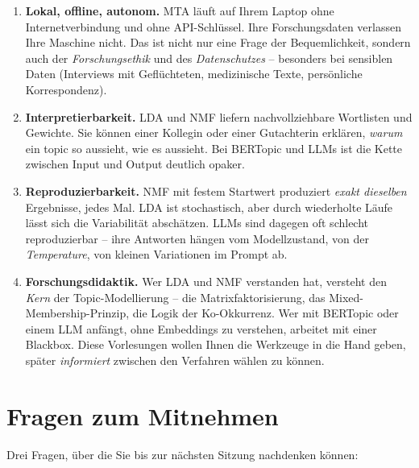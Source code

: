 \documentclass[a4paper,11pt]{article}
\begin{document}
\begin{enumerate}
\item \textbf{Lokal, offline, autonom.} MTA läuft auf Ihrem Laptop
ohne Internetverbindung und ohne API-Schlüssel. Ihre Forschungsdaten
verlassen Ihre Maschine nicht. Das ist nicht nur eine Frage der
Bequemlichkeit, sondern auch der \emph{Forschungsethik} und des
\emph{Datenschutzes} -- besonders bei sensiblen Daten (Interviews
mit Geflüchteten, medizinische Texte, persönliche Korrespondenz).

\item \textbf{Interpretierbarkeit.} LDA und NMF liefern
nachvollziehbare Wortlisten und Gewichte. Sie können einer Kollegin
oder einer Gutachterin erklären, \emph{warum} ein topic so aussieht,
wie es aussieht. Bei BERTopic und LLMs ist die Kette zwischen Input
und Output deutlich opaker.

\item \textbf{Reproduzierbarkeit.} NMF mit festem Startwert produziert
\emph{exakt dieselben} Ergebnisse, jedes Mal. LDA ist stochastisch,
aber durch wiederholte Läufe lässt sich die Variabilität abschätzen.
LLMs sind dagegen oft schlecht reproduzierbar -- ihre Antworten
hängen vom Modellzustand, von der \emph{Temperature}, von kleinen
Variationen im Prompt ab.

\item \textbf{Forschungsdidaktik.} Wer LDA und NMF verstanden hat,
versteht den \emph{Kern} der Topic-Modellierung -- die
Matrixfaktorisierung, das Mixed-Membership-Prinzip, die Logik der
Ko-Okkurrenz. Wer mit BERTopic oder einem LLM anfängt, ohne
Embeddings zu verstehen, arbeitet mit einer Blackbox. Diese
Vorlesungen wollen Ihnen die Werkzeuge in die Hand geben, später
\emph{informiert} zwischen den Verfahren wählen zu können.
\end{enumerate}

\section{Fragen zum Mitnehmen}

Drei Fragen, über die Sie bis zur nächsten Sitzung nachdenken können:
\end{document}
